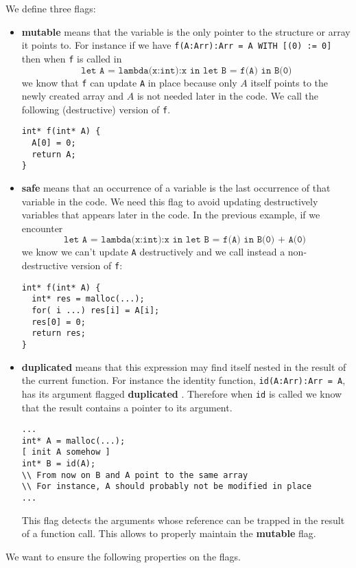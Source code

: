 \documentclass[12pt,a4paper]{article}
\newcommand{\cl}[1]{\texttt{#1}}
\newcommand{\bang}{\textbf{mutable }}
\newcommand{\safe}{\textbf{safe }}
\newcommand{\dupl}{\textbf{duplicated }}
\begin{document}
We define three flags:
\begin{itemize}
\item \bang means that the variable is the only pointer to the structure or array it points to. For instance if we have \cl{f(A:Arr):Arr = A WITH [(0) := 0]} then when \cl{f} is called in
$$ \cl{let A = lambda(x:int):x in let B = f(A) in B(0)} $$
we know that \cl{f} can update \cl{A} in place because only $A$ itself points to the newly created array and $A$ is not needed later in the code. We call the following (destructive) version of \cl{f}.
\begin{lstlisting}
int* f(int* A) {
  A[0] = 0;
  return A;
}
\end{lstlisting}

\item \safe means that an occurrence of a variable is the last occurrence of that variable in the code. We need this flag to avoid updating destructively variables that appears later in the code. In the previous example, if we encounter
$$ \cl{let A = lambda(x:int):x in let B = f(A) in B(0) + A(0) }$$
we know we can't update \cl{A} destructively and we call instead a non-destructive version of \cl{f}:
\begin{lstlisting}
int* f(int* A) {
  int* res = malloc(...);
  for( i ...) res[i] = A[i];
  res[0] = 0;
  return res;
}
\end{lstlisting}

\item \dupl means that this expression may find itself nested in the result of the current function. For instance the identity function, \cl{id(A:Arr):Arr = A}, has its argument flagged \dupl. Therefore when \cl{id} is called we know that the result contains a pointer to its argument.
\begin{lstlisting}
...
int* A = malloc(...);
[ init A somehow ]
int* B = id(A);
\\ From now on B and A point to the same array
\\ For instance, A should probably not be modified in place
...
\end{lstlisting}
This flag detects the arguments whose reference can be trapped in the result of a function call. This allows to properly maintain the \bang flag.
\end{itemize}




We want to ensure the following properties on the flags.\\
\newline
\end{document}
